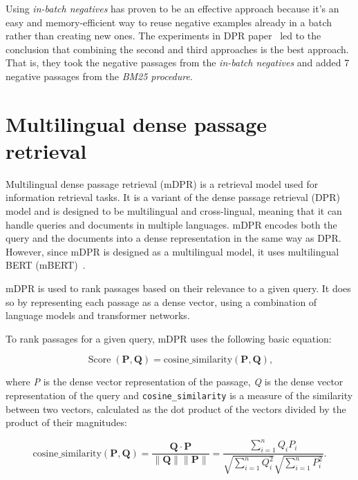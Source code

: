 Using \emph{in-batch negatives} has proven to be an effective approach because it's an easy and memory-efficient way to reuse negative examples already in a batch rather than creating new ones. The experiments in DPR paper~\cite{DPR} led to the conclusion that combining the second and third approaches is the best approach. That is, they took the negative passages from the \emph{in-batch negatives} and added 7 negative passages from the \emph{BM25 procedure}.


\section{Multilingual dense passage retrieval}
Multilingual dense passage retrieval \cite{mDPR} (mDPR) is a retrieval model used for information retrieval tasks. It is a variant of the dense passage retrieval \cite{DPR} (DPR) model and is designed to be multilingual and cross-lingual, meaning that it can handle queries and documents in multiple languages. mDPR encodes both the query and the documents into a dense representation in the same way as DPR. However, since mDPR is designed as a multilingual model, it uses multilingual BERT (mBERT)~\cite{mbert}.

mDPR is used to rank passages based on their relevance to a given query. It does so by representing each passage as a dense vector, using a combination of language models and transformer networks.

To rank passages for a given query, mDPR uses the following basic equation:

\begin{equation}
    \operatorname{Score}(\mathbf{P}, \mathbf{Q}) = \text{cosine\_similarity}(\mathbf{P}, \mathbf{Q}),    
\end{equation}

\noindent where \emph{P} is the dense vector representation of the passage, \emph{Q} is the dense vector representation of the query and \texttt{cosine\_similarity} is a measure of the similarity between two vectors, calculated as the dot product of the vectors divided by the product of their magnitudes:

\begin{equation}
    \text{cosine\_similarity}(\mathbf{P}, \mathbf{Q}) = \frac{\mathbf{Q} \cdot \mathbf{P}}{\lVert \mathbf{Q} \rVert \lVert \mathbf{P} \rVert} = \frac{\sum_{i=1}^{n} Q_i P_i}{\sqrt{\sum_{i=1}^{n} Q_i^2} \sqrt{\sum_{i=1}^{n} P_i^2}}.
\end{equation}


